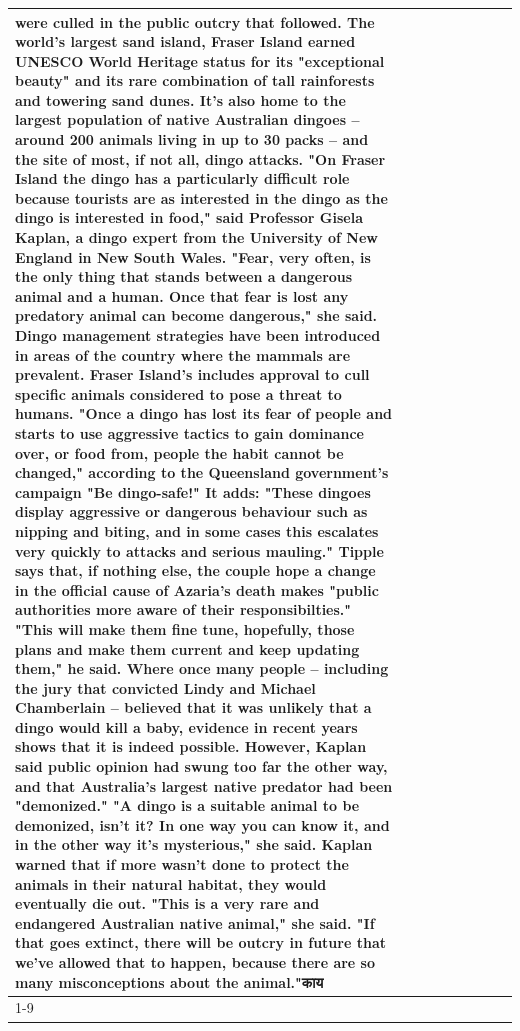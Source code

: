 \begin{table}[H]
\begin{tabular}{lllrlllll}
were culled in the public outcry that followed. The world's largest sand island, Fraser Island earned UNESCO World Heritage status for its "exceptional beauty" and its rare combination of tall rainforests and towering sand dunes. It's also home to the largest population of native Australian dingoes -- around 200 animals living in up to 30 packs -- and the site of most, if not all, dingo attacks. "On Fraser Island the dingo has a particularly difficult role because tourists are as interested in the dingo as the dingo is interested in food," said Professor Gisela Kaplan, a dingo expert from the University of New England in New South Wales. "Fear, very often, is the only thing that stands between a dangerous animal and a human. Once that fear is lost any predatory animal can become dangerous," she said. Dingo management strategies have been introduced in areas of the country where the mammals are prevalent. Fraser Island's includes approval to cull specific animals considered to pose a threat to humans. "Once a dingo has lost its fear of people and starts to use aggressive tactics to gain dominance over, or food from, people the habit cannot be changed," according to the Queensland government's campaign "Be dingo-safe!" It adds: "These dingoes display aggressive or dangerous behaviour such as nipping and biting, and in some cases this escalates very quickly to attacks and serious mauling." Tipple says that, if nothing else, the couple hope a change in the official cause of Azaria's death makes "public authorities more aware of their responsibilties." "This will make them fine tune, hopefully, those plans and make them current and keep updating them," he said. Where once many people -- including the jury that convicted Lindy and Michael Chamberlain -- believed that it was unlikely that a dingo would kill a baby, evidence in recent years shows that it is indeed possible. However, Kaplan said public opinion had swung too far the other way, and that Australia's largest native predator had been "demonized." "A dingo is a suitable animal to be demonized, isn't it? In one way you can know it, and in the other way it's mysterious," she said. Kaplan warned that if more wasn't done to protect the animals in their natural habitat, they would eventually die out. "This is a very rare and endangered Australian native animal," she said. "If that goes extinct, there will be outcry in future that we've allowed that to happen, because there are so many misconceptions about the animal."काय \\
\cline{1-9}

\end{tabular}
\end{table}
